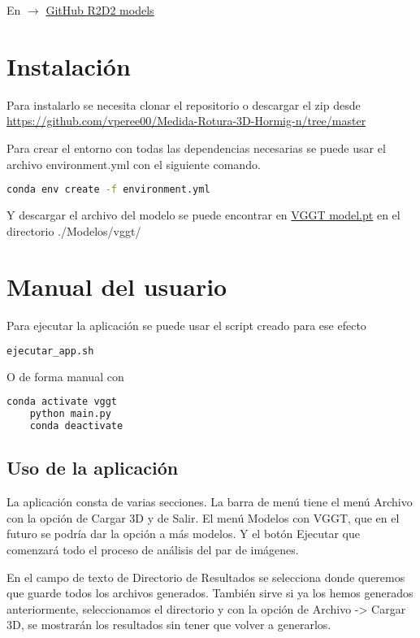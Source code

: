 En  $\rightarrow$
\href{https://github.com/naver/r2d2/tree/master/models}{GitHub R2D2 models}


\section{Instalación}
Para instalarlo se necesita clonar el repositorio o descargar el zip desde \href{https://github.com/vperee00/Medida-Rotura-3D-Hormig-n/tree/master}{https://github.com/vperee00/Medida-Rotura-3D-Hormig-n/tree/master}

Para crear el entorno con todas las dependencias necesarias se puede usar el archivo environment.yml con el siguiente comando.


\begin{lstlisting}[language=bash]
	conda env create -f environment.yml
\end{lstlisting}

Y descargar el archivo del modelo se puede encontrar en \href{https://huggingface.co/facebook/VGGT-1B/blob/main/model.pt}{VGGT model.pt} en el directorio ./Modelos/vggt/

\section{Manual del usuario}
Para ejecutar la aplicación se puede usar el script creado para ese efecto

\begin{lstlisting}[language=bash]
	ejecutar_app.sh
\end{lstlisting}

O de forma manual con 
\begin{lstlisting}[language=bash]
	conda activate vggt
	python main.py
	conda deactivate
\end{lstlisting}

\subsection{Uso de la aplicación}
La aplicación consta de varias secciones. La barra de menú tiene el menú Archivo con la opción de Cargar 3D y de Salir. El menú Modelos con VGGT, que en el futuro se podría dar la opción a más modelos. Y el botón Ejecutar que comenzará todo el proceso de análisis del par de imágenes.


En el campo de texto de Directorio de Resultados se selecciona donde queremos que guarde todos los archivos generados. También sirve si ya los hemos generados anteriormente, seleccionamos el directorio y con la opción de Archivo -> Cargar 3D, se mostrarán los resultados sin tener que volver a generarlos.

